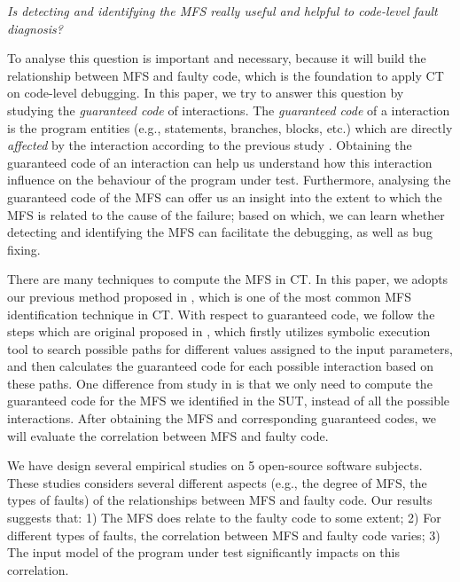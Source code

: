 \documentclass{sig-alternate-05-2015}
\begin{document}
\emph{Is detecting and identifying the MFS really useful and helpful to code-level fault diagnosis?}

To analyse this question is important and necessary, because it will build the relationship between MFS and faulty code, which is the foundation to apply CT on code-level debugging. In this paper, we try to answer this question by studying the \emph{guaranteed code} of interactions. The \emph{guaranteed code} of a interaction is the program entities (e.g., statements, branches, blocks, etc.) which are directly \emph{affected} by the interaction according to the previous study \cite{reisner2010using}. Obtaining the guaranteed code of an interaction can help us understand how this interaction influence on the behaviour of the program under test. Furthermore, analysing the guaranteed code of the MFS can offer us an insight into the extent to which the MFS is related to the cause of the failure; based on which, we can learn whether detecting and identifying the MFS can facilitate the debugging, as well as bug fixing.

%
%

%
There are many techniques to compute the MFS in CT. In this paper, we adopts our previous method proposed in \cite{nie2011minimal}, which is one of the most common MFS identification technique in CT. With respect to guaranteed code, we follow the steps which are original proposed in \cite{reisner2010using}, which firstly utilizes symbolic execution tool to search possible paths for different values assigned to the input parameters, and then calculates the guaranteed code for each possible interaction based on these paths. One difference from study in \cite{reisner2010using} is that we only need to compute the guaranteed code for the MFS we identified in the SUT, instead of all the possible interactions. After obtaining the MFS and corresponding guaranteed codes, we will evaluate the correlation between MFS and faulty code.

We have design several empirical studies on 5 open-source software subjects. These studies considers several different aspects (e.g., the degree of MFS, the types of faults) of the relationships between MFS and faulty code. Our results suggests that: 1) The MFS does relate to the faulty code to some extent; 2) For different types of faults, the correlation between MFS and faulty code varies;  3) The input model of the program under test significantly impacts on this correlation.
\end{document}
